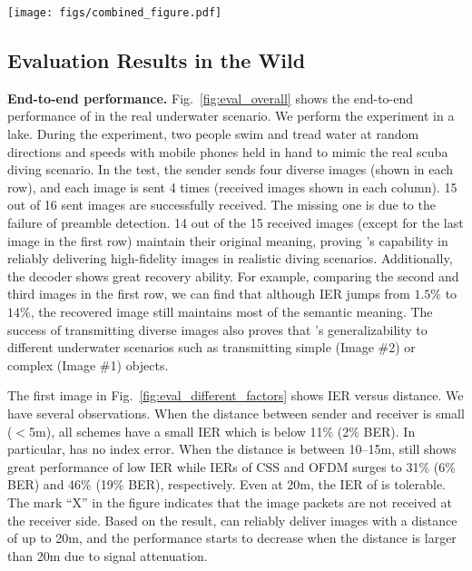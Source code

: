 \begin{figure*}[t]
    \centering
    \texttt{[image: figs/combined\_figure.pdf]}
    \caption{Impact of different physical factors. An ``X'' mark indicates that the receiver does not receive the image packets.}
    \label{fig:eval_different_factors}
\end{figure*}


\subsection{Evaluation Results in the Wild}\label{sec:eval_results}

\noindent\textbf{End-to-end performance.}
Fig.~\ref{fig:eval_overall} shows the end-to-end performance of \sysname in the real underwater scenario. We perform the experiment in a lake. During the experiment, two people swim and tread water at random directions and speeds with mobile phones held in hand to mimic the real scuba diving scenario.
In the test, the sender sends four diverse images (shown in each row), and each image is sent 4 times (received images shown in each column).  15 out of 16 sent images are successfully received. The missing one is due to the failure of preamble detection. 14 out of the 15 received images (except for the last image in the first row) maintain their original meaning, proving \sysname's capability in reliably delivering high-fidelity images in realistic diving scenarios. Additionally, the decoder shows great recovery ability. For example, comparing the second and third images in the first row, we can find that although IER jumps from $1.5\%$ to $14\%$, the recovered image still maintains most of the semantic meaning. The success of transmitting diverse images also proves that \sysname's generalizability to different underwater scenarios such as transmitting simple (Image \#2) or complex (Image \#1) objects.


 The first image in Fig.~\ref{fig:eval_different_factors} shows IER versus distance. We have several observations. When the distance between sender and receiver is small ($<$5m), all schemes have a small IER which is below 11\% (2\% BER). In particular, \sysname has no index error.
When the distance is between 10--15m, \sysname still shows great performance of low IER while IERs of CSS and OFDM surges to 31\% (6\% BER) and 46\% (19\% BER), respectively.
Even at 20m, the IER of \sysname is tolerable. The mark ``X'' in the figure indicates that the image packets are not received at the receiver side. Based on the result, \sysname can reliably deliver images with a distance of up to 20m, and the performance starts to decrease when the distance is larger than 20m due to signal attenuation.

